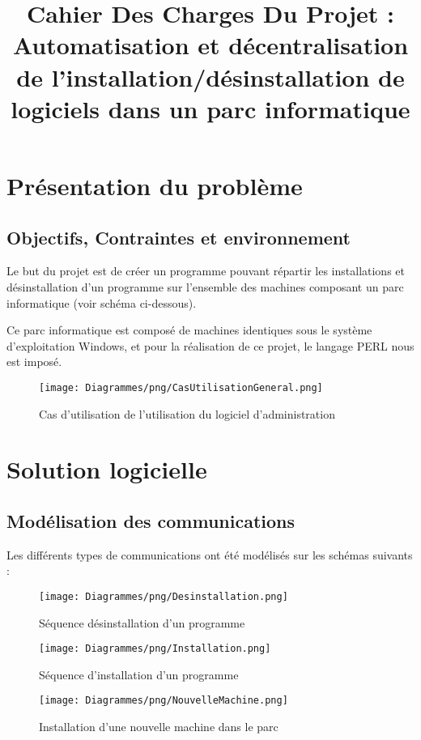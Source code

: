 \documentclass[11pt]{article}
\title{\begin{center}\hspace{1.5cm}Cahier Des Charges Du Projet : \newline
              \newline
               \newline
 \textbf{ Automatisation et décentralisation de l'installation/désinstallation de logiciels dans un parc informatique} 
  \end{center}}
\begin{document}
\maketitle

\newpage

\tableofcontents

\newpage
\section{Présentation du problème}
\subsection{Objectifs, Contraintes et environnement}
Le but du projet est de créer un programme pouvant répartir les installations et désinstallation d'un programme sur l'ensemble des machines composant un parc informatique (voir schéma ci-dessous).

Ce parc informatique est composé de machines identiques sous le système d'exploitation Windows, et pour la réalisation de ce projet, le langage PERL nous est imposé.
\begin{figure}[h!]
    \center
    \texttt{[image: Diagrammes/png/CasUtilisationGeneral.png]}
    \caption{Cas d'utilisation de l'utilisation du logiciel d'administration}
\end{figure}




\section{Solution logicielle}
\subsection{Modélisation des communications}
Les différents types de communications ont été modélisés sur les schémas suivants :

\begin{figure}[h!]
    \center
    \texttt{[image: Diagrammes/png/Desinstallation.png]}
    \caption{Séquence désinstallation d'un programme}
\end{figure}
\begin{figure}[h!]
    \center
    \texttt{[image: Diagrammes/png/Installation.png]}
    \caption{Séquence d'installation d'un programme}
\end{figure}
\begin{figure}[h!]
    \center
    \texttt{[image: Diagrammes/png/NouvelleMachine.png]}
    \caption{Installation d'une nouvelle machine dans le parc}
\end{figure}
\newpage
\end{document}
